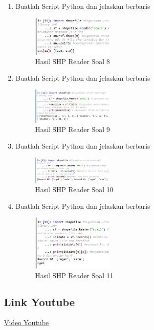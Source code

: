 \begin{enumerate}
    \item Buatlah Script Python dan jelaskan berbaris
    
    \hfill\break
    \begin{figure}[H]
		\includegraphics[width=4cm]{figures/1174009/3/8.png}
		\centering
		\caption{Hasil SHP Reader Soal 8}
    \end{figure}

    \item Buatlah Script Python dan jelaskan berbaris
    
    \hfill\break
    \begin{figure}[H]
		\includegraphics[width=4cm]{figures/1174009/3/9.png}
		\centering
		\caption{Hasil SHP Reader Soal 9}
    \end{figure}

    \item Buatlah Script Python dan jelaskan berbaris
    
    \hfill\break
    \begin{figure}[H]
		\includegraphics[width=4cm]{figures/1174009/3/10.png}
		\centering
		\caption{Hasil SHP Reader Soal 10}
    \end{figure}

    \item Buatlah Script Python dan jelaskan berbaris
    
    \hfill\break
    \begin{figure}[H]
		\includegraphics[width=4cm]{figures/1174009/3/11.png}
		\centering
		\caption{Hasil SHP Reader Soal 11}
    \end{figure}
\end{enumerate}
\subsection{Link Youtube}
\href{https://youtu.be/1Qu9ZIUIaV8}{Video Youtube}